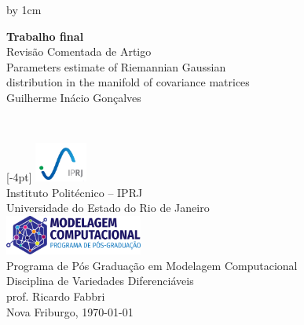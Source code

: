 \begin{titlepage}
\renewcommand{\title}{%
  {\LARGE Revisão Comentada de Artigo}\\
  Parameters estimate of Riemannian Gaussian\\distribution in the manifold of covariance matrices
}
\renewcommand{\author}{Guilherme Inácio Gonçalves}
\renewcommand{\date}{\today}
\newcommand{\info}{%
  \raisebox{4pt}[-4pt]{%
  \includegraphics[height=1.3cm]{figs/logo-iprj.png} 
  \hspace{0.1in}
  }\\

  Instituto Politécnico -- IPRJ\\
  Universidade do Estado do Rio de Janeiro\\[2em]
  
  \includegraphics[height=1.3cm]{figs/logo-ppgmc.png}\\
  Programa de Pós Graduação em Modelagem Computacional\\
  Disciplina de Variedades Diferenciáveis\\
  prof. Ricardo Fabbri\\[1em]

  Nova Friburgo, \date\\[1.5cm]
}

\newlength{\topToTitle} 
\setlength{\topToTitle}{0pt}

\newlength{\leftToTitle} 
\setlength{\leftToTitle}{-60pt}

\newlength{\titleToInfo} 
\setlength{\titleToInfo}{9.7cm}

\newlength{\myTextWidth}
\setlength{\myTextWidth}{\textwidth}
\advance\myTextWidth by 1cm


\thispagestyle{empty}
\vspace*{\topToTitle}
\begin{minipage}{\myTextWidth}
  \sffamily
  \hspace*{\leftToTitle}\begin{minipage}{11cm}
    \Large\textbf{Trabalho final}\\[1.5cm]
    \title\\[1.5cm]
    \author
  \end{minipage}\\

  \vspace*{\titleToInfo}

  \begin{minipage}{\textwidth}
    \flushright
    \info
  \end{minipage}
\end{minipage}%
\end{titlepage}
